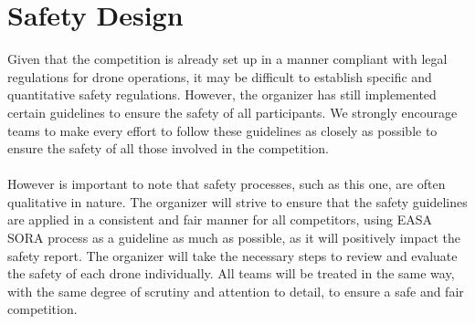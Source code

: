 \documentclass{article}
\begin{document}
\section{Safety Design}
Given that the competition is already set up in a manner compliant with legal regulations for drone operations, it may be difficult to establish specific and quantitative safety regulations. However, the organizer has still implemented certain guidelines to ensure the safety of all participants. We strongly encourage teams to make every effort to follow these guidelines as closely as possible to ensure the safety of all those involved in the competition. 
\\ \\ 
However is important to note that safety processes, such as this one, are often qualitative in nature. The organizer will strive to ensure that the safety guidelines are applied in a consistent and fair manner for all competitors, using EASA SORA process as a guideline as much as possible, as it will positively impact the safety report. The organizer will take the necessary steps to review and evaluate the safety of each drone individually. All teams will be treated in the same way, with the same degree of scrutiny and attention to detail, to ensure a safe and fair competition.
\end{document}
